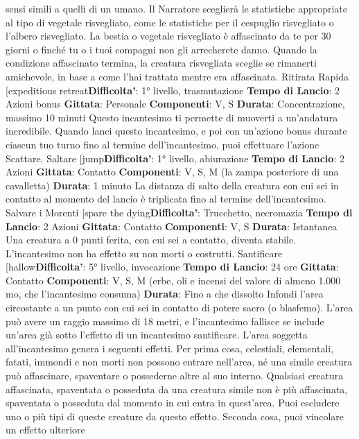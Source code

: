 \begin{multicols}{2}
sensi simili a quelli di un umano. Il Narratore sceglierà le
statistiche appropriate al tipo di vegetale risvegliato,
come le statistiche per il cespuglio risvegliato o l’albero
risvegliato.
La bestia o vegetale risvegliato è affascinato da te per
30 giorni o finché tu o i tuoi compagni non gli
arrecherete danno. Quando la condizione affascinato
termina, la creatura risvegliata sceglie se rimanerti
amichevole, in base a come l’hai trattata mentre era
affascinata.
Ritirata Rapida
[expeditious retreat\textbf{Difficolta'}:
1° livello, trasmutazione
\textbf{Tempo di Lancio}: 2 Azioni bonus
\textbf{Gittata}: Personale
\textbf{Componenti}: V, S
\textbf{Durata}: Concentrazione, massimo 10 minuti
Questo incantesimo ti permette di muoverti a
un’andatura incredibile. Quando lanci questo
incantesimo, e poi con un’azione bonus durante
ciascun tuo turno fino al termine dell’incantesimo, puoi
effettuare l’azione Scattare.
Saltare
[jump\textbf{Difficolta'}:
1° livello, abiurazione
\textbf{Tempo di Lancio}: 2 Azioni
\textbf{Gittata}: Contatto
\textbf{Componenti}: V, S, M (la zampa posteriore di una
cavalletta)
\textbf{Durata}: 1 minuto
La distanza di salto della creatura con cui sei in contatto
al momento del lancio è triplicata fino al termine
dell’incantesimo.
Salvare i Morenti
[spare the dying\textbf{Difficolta'}:
Trucchetto, necromazia
\textbf{Tempo di Lancio}: 2 Azioni
\textbf{Gittata}: Contatto
\textbf{Componenti}: V, S
\textbf{Durata}: Istantanea
Una creatura a 0 punti ferita, con cui sei a contatto,
diventa stabile. L’incantesimo non ha effetto su non
morti o costrutti.
Santificare
[hallow\textbf{Difficolta'}:
5° livello, invocazione
\textbf{Tempo di Lancio}: 24 ore
\textbf{Gittata}: Contatto
\textbf{Componenti}: V, S, M (erbe, oli e incensi del valore di
almeno 1.000 mo, che l’incantesimo consuma)
\textbf{Durata}: Fino a che dissolto
Infondi l’area circostante a un punto con cui sei in
contatto di potere sacro (o blasfemo). L’area può avere
un raggio massimo di 18 metri, e l’incantesimo fallisce
se include un’area già sotto l’effetto di un incantesimo
santificare. L’area soggetta all’incantesimo genera i
seguenti effetti.
Per prima cosa, celestiali, elementali, fatati, immondi e
non morti non possono entrare nell’area, né una simile
creatura può affascinare, spaventare o possederne
altre al suo interno. Qualsiasi creatura affascinata,
spaventata o posseduta da una creatura simile non è
più affascinata, spaventata o posseduta dal momento in
cui entra in quest’area. Puoi escludere uno o più tipi di
queste creature da questo effetto.
Seconda cosa, puoi vincolare un effetto ulteriore

\end{multicols}
